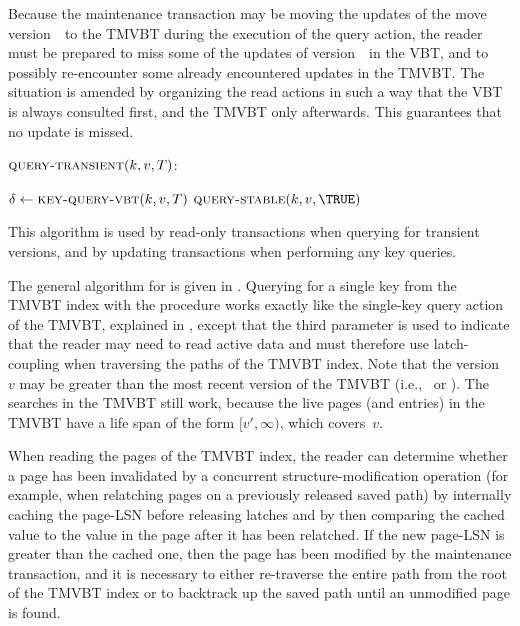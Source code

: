 Because the maintenance transaction may be moving the updates
of the move version~\movever\ to the TMVBT during the execution of the query
action, the reader must be prepared to miss some of the updates of
version~\movever\ in the VBT, and to possibly re-encounter some already
encountered updates in the TMVBT\@. 
The situation is amended by organizing the read actions in such a way that
the VBT is always consulted first, and the TMVBT only afterwards.
This guarantees that no update is missed.

\begin{algorithm}[htb]
$\proc{query-transient}(k, v, T)$:

\begin{algorithmic}[1]
\STATE $\updatemark \gets \proc{key-query-VBT}(k, v, T)$
  \RETURN $\proc{query-stable}(k, v, \TRUE)$
  \RETURN \nullmark
{}
  \RETURN \updatemark
\ENDIF
\end{algorithmic}
%
{This algorithm is used by read-only transactions when querying for transient
versions, and by updating transactions when performing any key queries.}
\label{alg:query-transient}
\end{algorithm}

The general algorithm for  is given in
\@.
Querying for a single key from the TMVBT index with the procedure
 works exactly like the single-key query action of the
TMVBT, explained in , except that the third
parameter is used to indicate that the reader may need to read active data
and must therefore use latch-coupling when traversing the paths of the TMVBT
index. 
Note that the version~$v$ may be greater than the most recent version
of the TMVBT (i.e., \stablever\ or \movever).
The searches in the TMVBT still work, because the live pages (and entries) in
the TMVBT have a life span of the form $[v',\infty)$, which covers~$v$.

When reading the pages of the TMVBT index, the reader can determine whether a
page has been invalidated by a concurrent structure-modification operation
(for example, when relatching pages on a previously released saved path) by
internally caching the page-LSN before releasing latches and by then
comparing the cached value to the value in the page after it has been
relatched. 
If the new page-LSN is greater than the cached one, then the page has
been modified by the maintenance transaction, and it is necessary to either
re-traverse the entire path from the root of the TMVBT index or to backtrack
up the saved path until an unmodified page is found.

